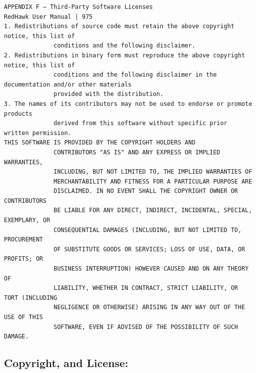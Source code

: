 \begin{lstlisting}[basicstyle=\ttfamily\scriptsize,breaklines=true]
APPENDIX F — Third-Party Software Licenses                                   RedHawk User Manual | 975
1. Redistributions of source code must retain the above copyright notice, this list of
              conditions and the following disclaimer.
2. Redistributions in binary form must reproduce the above copyright notice, this list of
              conditions and the following disclaimer in the documentation and/or other materials
              provided with the distribution.
3. The names of its contributors may not be used to endorse or promote      products
              derived from this software without specific prior written permission.
THIS SOFTWARE IS PROVIDED BY THE COPYRIGHT HOLDERS AND
              CONTRIBUTORS "AS IS" AND ANY EXPRESS OR IMPLIED WARRANTIES,
              INCLUDING, BUT NOT LIMITED TO, THE IMPLIED WARRANTIES OF
              MERCHANTABILITY AND FITNESS FOR A PARTICULAR PURPOSE ARE
              DISCLAIMED. IN NO EVENT SHALL THE COPYRIGHT OWNER OR CONTRIBUTORS
              BE LIABLE FOR ANY DIRECT, INDIRECT, INCIDENTAL, SPECIAL, EXEMPLARY, OR
              CONSEQUENTIAL DAMAGES (INCLUDING, BUT NOT LIMITED TO, PROCUREMENT
              OF SUBSTITUTE GOODS OR SERVICES; LOSS OF USE, DATA, OR PROFITS; OR
              BUSINESS INTERRUPTION) HOWEVER CAUSED AND ON ANY THEORY OF
              LIABILITY, WHETHER IN CONTRACT, STRICT LIABILITY, OR TORT (INCLUDING
              NEGLIGENCE OR OTHERWISE) ARISING IN ANY WAY OUT OF THE USE OF THIS
              SOFTWARE, EVEN IF ADVISED OF THE POSSIBILITY OF SUCH DAMAGE.
\end{lstlisting}

\subsection{Copyright, and License:}

